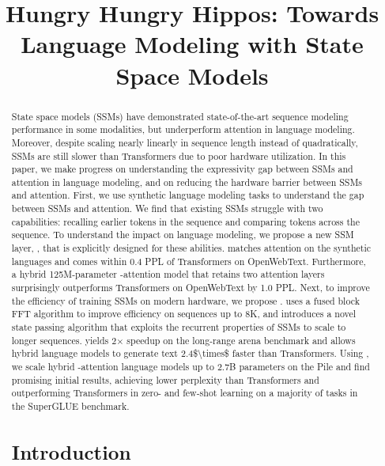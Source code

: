 \title{Hungry Hungry Hippos: Towards Language Modeling with State Space Models}



\maketitle

\begin{abstract}

State space models (SSMs) have demonstrated state-of-the-art sequence modeling performance in some modalities, but underperform attention in language modeling.
Moreover, despite scaling nearly linearly in sequence length instead of quadratically, SSMs are still slower than Transformers due to poor hardware utilization.
In this paper, we make progress on understanding the expressivity gap between SSMs and attention in language modeling, and on reducing the hardware barrier between SSMs and attention.
First, we use synthetic language modeling tasks to understand the gap between SSMs and attention.
We find that existing SSMs struggle with two capabilities: recalling earlier tokens in the sequence and comparing tokens across the sequence.
To understand the impact on language modeling, we propose a new SSM layer, \hthree, that is explicitly designed for these abilities.
\hthree matches attention on the synthetic languages and comes within \num{0.4} PPL of Transformers on OpenWebText.
Furthermore, a hybrid 125M-parameter \hthree-attention model that retains two attention layers
surprisingly outperforms Transformers on OpenWebText by \num{1.0} PPL.
Next, to improve the efficiency of training SSMs on modern hardware,
we propose \fastfft.
\fastfft uses a fused block FFT algorithm to improve efficiency on sequences up to 8K, and introduces a novel state passing algorithm that exploits the recurrent properties of SSMs to scale to longer sequences.
\fastfft yields 2$\times$ speedup on the long-range arena benchmark and allows hybrid language models to generate text \num{2.4$\times$} faster than Transformers.
Using \fastfft, we scale hybrid \hthree-attention language models up to 2.7B parameters on the Pile and find promising initial results, achieving lower perplexity than Transformers and outperforming Transformers in zero- and few-shot learning on a majority of tasks in the SuperGLUE benchmark.

\section{Introduction}
\label{sec:intro}


\end{abstract}
